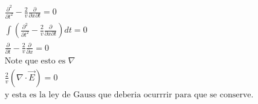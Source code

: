 \documentclass[12pt]{exam}
\begin{document}
\begin{enumerate}
\begin{enumerate}
\begin{align*}
				&\frac{\partial^2}{\partial t^2} - \frac{2}{v}\frac{\partial}{\partial x\partial t} = 0\\
				&\int (\frac{\partial^2}{\partial t^2} - \frac{2}{v}\frac{\partial}{\partial x\partial t}) dt = 0\\
				&\frac{\partial}{\partial t} - \frac{2}{v}\frac{\partial}{\partial x} = 0\\
				&\text{Note que esto es }\nabla\\
				&\frac{2}{v} (\nabla\cdot\Vec{E}) = 0\\
				&\text{y esta es la ley de Gauss que deberia ocurrrir para que se conserve.}
			\end{align*}
\end{enumerate}
\end{enumerate}
\end{document}
